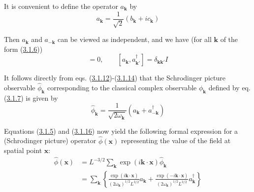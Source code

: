 \documentclass[11pt,a4paper]{article}
\begin{document}
It is convenient to define the operator \(a_{\mathbf k}\) by
\begin{equation*}
a_{\mathbf{k}} = \frac{1}{\sqrt{2}} (b_{\mathbf{k}} + ic_{\mathbf{k}}) \tag{3.1.14}\label{eq:3.1.14}
\end{equation*}

Then \(a_{\mathbf{k}}\) and \(a_{-\mathbf{k}}\) can be viewed as independent, and we have (for all \(\mathbf{k}\) of the form (\hyperref[eq:3.1.6]{3.1.6}))
\begin{equation*}
[a_{\mathbf{k}},a_{\mathbf{k}'}]=0,\qquad [a_{\mathbf{k}},a_{\mathbf{k}'}^{\dagger}]=\delta_{\mathbf{k}\mathbf{k}'}I \tag{3.1.15}\label{eq:3.1.15}
\end{equation*}

It follows directly from eqs. (\hyperref[eq:3.1.12]{3.1.12})-(\hyperref[eq:3.1.14]{3.1.14}) that the Schrodinger picture observable \(\hat{\phi}_{\mathbf{k}}\) corresponding to the classical complex observable\hypertarget{source-48}{} \(\phi_{\mathbf{k}}\) defined by eq. (\hyperref[eq:3.1.7]{3.1.7}) is given by
\begin{equation*}
\hat{\phi}_{\mathbf{k}} = \frac{1}{\sqrt{2\omega_{\mathbf{k}}}} (a_{\mathbf{k}} + a_{-\mathbf{k}}^{\dagger}) \tag{3.1.16}\label{eq:3.1.16}
\end{equation*}

Equations (\hyperref[eq:3.1.5]{3.1.5}) and (\hyperref[eq:3.1.16]{3.1.16}) now yield the following formal expression for a (Schrodinger picture) operator \(\hat{\phi}(\mathbf{x})\) representing the value of the field at spatial point \(\mathbf{x}\):
\begin{equation*}
\begin{aligned} \widehat{\phi}(\mathbf{x}) &= L^{-3/2} \sum_{\mathbf{k}} \exp(i \mathbf{k}\cdot\mathbf{x}) \widehat{\phi}_{\mathbf{k}} \\ &= \sum_{\mathbf{k}} \left\{ \frac{\exp(i \mathbf{k}\cdot\mathbf{x})}{(2 \omega_{ \mathbf{k}})^{1/2}L^{ 3/2}} a_{\mathbf{k}} + \frac{\exp(-i \mathbf{k}\cdot\mathbf{x})}{(2 \omega_{ \mathbf{k}})^{1/2}L^{ 3/2}} a_{\mathbf{k}} ^{\dagger} \right\} \end{aligned}\tag{3.1.17}\label{eq:3.1.17}
\end{equation*}
\end{document}
